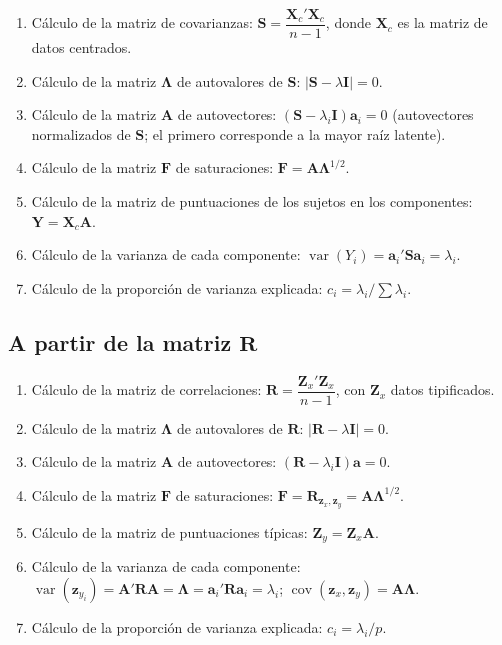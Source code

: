 \documentclass[12pt, a4paper]{article}
\theoremstyle{plain}
\theoremstyle{definition}
\theoremstyle{remark}
\newcommand{\mat}[1]{\mathbf{#1}}
\begin{document}
\begin{enumerate}[label=\Roman*)]
  \item Cálculo de la matriz de covarianzas:
        $\mat{S} = \dfrac{\mat{X}_c'\mat{X}_c}{n-1}$, donde
        $\mat{X}_c$ es la matriz de datos centrados.
  \item Cálculo de la matriz $\boldsymbol{\Lambda}$ de autovalores de $\mat{S}$:
        $|\mat{S}-\lambda\mat{I}|=0$.
  \item Cálculo de la matriz $\mat{A}$ de autovectores:
        $(\mat{S}-\lambda_i\mat{I})\mathbf{a}_i=0$
        (autovectores normalizados de $\mat{S}$; el primero corresponde a la
        mayor raíz latente).
  \item Cálculo de la matriz $\mat{F}$ de saturaciones:
        $\mat{F}=\mat{A}\boldsymbol{\Lambda}^{1/2}$.
  \item Cálculo de la matriz de puntuaciones de los sujetos en los
        componentes: $\mat{Y}=\mat{X}_c\mat{A}$.
  \item Cálculo de la varianza de cada componente:
        $\operatorname{var}(Y_i)=\mathbf{a}_i'\mat{S}\mathbf{a}_i=\lambda_i$.
  \item Cálculo de la proporción de varianza explicada:
        $c_i = \lambda_i/\sum\lambda_i$.
\end{enumerate}

\subsection*{A partir de la matriz $\mat{R}$}

\begin{enumerate}[label=\Roman*)]
  \item Cálculo de la matriz de correlaciones:
        $\mat{R} = \dfrac{\mat{Z}_x'\mat{Z}_x}{n-1}$, con $\mat{Z}_x$ datos
        tipificados.
  \item Cálculo de la matriz $\boldsymbol{\Lambda}$ de autovalores de $\mat{R}$:
        $|\mat{R}-\lambda\mat{I}|=0$.
  \item Cálculo de la matriz $\mat{A}$ de autovectores:
        $(\mat{R}-\lambda_i\mat{I})\mathbf{a}=0$.
  \item Cálculo de la matriz $\mat{F}$ de saturaciones:
        $\mat{F}=\mat{R}_{\mathbf{z}_x,\mathbf{z}_y}=\mat{A}\boldsymbol{\Lambda}^{1/2}$.
  \item Cálculo de la matriz de puntuaciones típicas:
        $\mat{Z}_y=\mat{Z}_x\mat{A}$.
  \item Cálculo de la varianza de cada componente:
        $\operatorname{var}(\mathbf{z}_{y_i})=\mat{A}'\mat{R}\mat{A}=\boldsymbol{\Lambda}
        =\mathbf{a}_i'\mat{R}\mathbf{a}_i=\lambda_i$;
        $\operatorname{cov}(\mathbf{z}_x,\mathbf{z}_y)=\mat{A}\boldsymbol{\Lambda}$.
  \item Cálculo de la proporción de varianza explicada:
        $c_i=\lambda_i/p$.
\end{enumerate}
\end{document}
